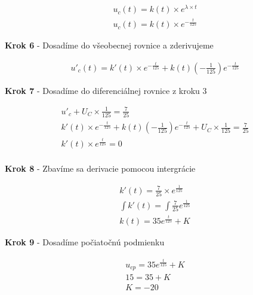 \begin{gather*}
    u_{c}(t) = k(t) \times e^{\lambda \times t} \\
    u_{c}(t) = k(t) \times e^{-\frac {t}{125}}
\end{gather*}

\begin{center}
    \textbf{Krok 6} - Dosadíme do všeobecnej rovnice a zderivujeme
\end{center}

\begin{gather*}
    u'_{c}(t) = k'(t) \times e^{-\frac {t}{125}} + k(t)(-\frac {1} {125})e^{-\frac {t}{125}}
\end{gather*}

\begin{center}
    \textbf{Krok 7} - Dosadíme do diferenciálnej rovnice z kroku 3
\end{center}

\begin{gather*}
    u'_{c} + U_{C} \times \frac {1} {125} = \frac {7} {25} \\
   k'(t) \times e^{-\frac {t}{125}} + k(t)(-\frac {1} {125})e^{-\frac {t}{125}} + U_{C} \times \frac {1} {125} = \frac {7} {25} \\
    k'(t) \times e^{\frac {t}{125}} = 0 \\
\end{gather*}

\begin{center}
    \textbf{Krok 8} - Zbavíme sa derivacie pomocou intergrácie
\end{center}

\begin{gather*}
    k'(t) = \frac {7} {25} \times e^{\frac {1}{125}} \\
    \int k'(t) = \int \frac {7} {25} e^{\frac {1}{125}} \\
    k(t) = 35e^{\frac{t}{125}} + K
\end{gather*}

\begin{center}
    \textbf{Krok 9} - Dosadíme počiatočnú podmienku
\end{center}

\begin{gather*}
   u_{cp} = 35e^{\frac{t}{125}} + K \\
   15 = 35 + K \\
    K = - 20
\end{gather*}

